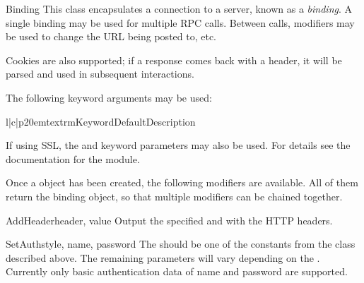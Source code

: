 \begin{classdesc}{Binding}{}
This class encapsulates a connection to a server, known as a \emph{binding}.
A single binding may be used for multiple RPC calls.
Between calls, modifiers may be used to change the URL being posted to,
etc.

Cookies are also supported; if a response comes back with a 
header, it will be parsed and used in subsequent interactions.

The following keyword arguments may be used:

\begin{tableiii}{l|c|p{20em}}{textrm}{Keyword}{Default}{Description}
\end{tableiii}

If using SSL, the  and  keyword parameters may
also be used.
For details see the documentation for the  module.

\end{classdesc}

Once a  object has been created, the following modifiers are
available.
All of them return the binding object, so that multiple modifiers can
be chained together.

\begin{methoddesc}{AddHeader}{header, value}
Output the specified  and  with the HTTP
headers.
\end{methoddesc}

\begin{methoddesc}{SetAuth}{style, name, password}
The  should be one of the constants from the 
class described above.
The remaining parameters will vary depending on the .
Currently only basic authentication data of name and password are
supported.
\end{methoddesc}

